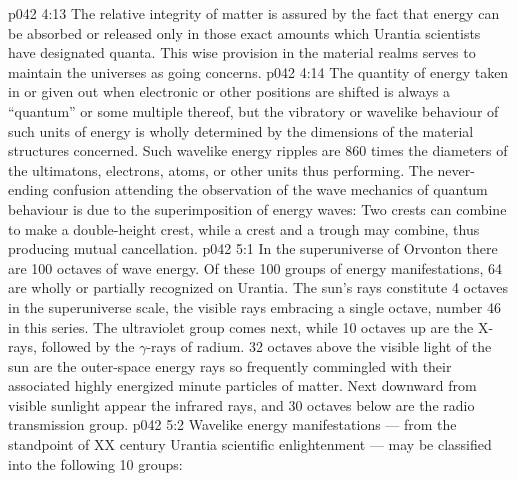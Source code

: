 \vs p042 4:13 \pc The relative integrity of matter is assured by the fact that energy can be absorbed or released only in those exact amounts which Urantia scientists have designated quanta. This wise provision in the material realms serves to maintain the universes as going concerns.
\vs p042 4:14 The quantity of energy taken in or given out when electronic or other positions are shifted is always a “quantum” or some multiple thereof, but the vibratory or wavelike behaviour of such units of energy is wholly determined by the dimensions of the material structures concerned. Such wavelike energy ripples are 860 times the diameters of the ultimatons, electrons, atoms, or other units thus performing. The never\hyp{}ending confusion attending the observation of the wave mechanics of quantum behaviour is due to the superimposition of energy waves: Two crests can combine to make a double\hyp{}height crest, while a crest and a trough may combine, thus producing mutual cancellation.
\vs p042 5:1 In the superuniverse of Orvonton there are 100 octaves of wave energy. Of these 100 groups of energy manifestations, 64 are wholly or partially recognized on Urantia. The sun’s rays constitute 4 octaves in the superuniverse scale, the visible rays embracing a single octave, number 46 in this series. The ultraviolet group comes next, while 10 octaves up are the X\hyp{}rays, followed by the $\gamma$\hyp{}rays of radium. 32 octaves above the visible light of the sun are the outer\hyp{}space energy rays so frequently commingled with their associated highly energized minute particles of matter. Next downward from visible sunlight appear the infrared rays, and 30 octaves below are the radio transmission group.
\vs p042 5:2 \pc Wavelike energy manifestations --- from the standpoint of XX century Urantia scientific enlightenment --- may be classified into the following 10 groups:
